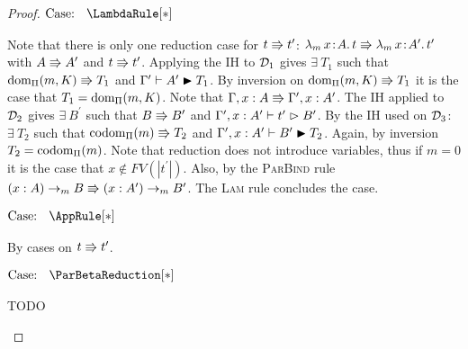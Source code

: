 \begin{proof}
    $\text{Case: }\begin{array}{c} \LambdaRule[*] \end{array}$
    \begin{proofcase}
        Note that there is only one reduction case for $t \Rrightarrow t^\prime$: ${\lambda_m}\, x\! : \! A.\, t \Rrightarrow {\lambda_m}\, x\! : \! A^\prime.\, t^\prime$ with $A \Rrightarrow A^\prime$ and $t \Rrightarrow t^\prime$.
        Applying the IH to $\mathcal{D}_{1}$ gives $\exists\ T_1$ such that $\mbox{\normalfont dom}_\Pi(m, K) \Rrightarrow T_1$ and $\Gamma^\prime \vdash A^\prime \blacktriangleright T_1$.
        By inversion on $\mbox{\normalfont dom}_\Pi(m, K) \Rrightarrow T_1$ it is the case that $T_1 = \mbox{\normalfont dom}_\Pi(m, K)$.
        Note that $\Gamma, x : A \Rrightarrow \Gamma^\prime, x : A^\prime$.
        The IH applied to $\mathcal{D}_{2}$ gives $\exists\ B^\prime$ such that $B \Rrightarrow B^\prime$ and $\Gamma^\prime, x : A^\prime \vdash t^\prime \vartriangleright B^\prime$.
        By the IH used on $\mathcal{D}_{3}$: $\exists\ T_2$ such that $\mbox{\normalfont codom}_\Pi(m) \Rrightarrow T_2$ and $\Gamma^\prime, x : A^\prime \vdash B^\prime \blacktriangleright T_2$.
        Again, by inversion $T_2 = \mbox{\normalfont codom}_\Pi(m)$.
        Note that reduction does not introduce variables, thus if $m = 0$ it is the case that $x \notin FV(|t^\prime|)$.
        Also, by the \textsc{ParBind} rule $(x : A) \to_m B \Rrightarrow (x : A^\prime) \to_m B^\prime$.
        The \textsc{Lam} rule concludes the case.
    \end{proofcase}

    $\text{Case: }\begin{array}{c} \AppRule[*] \end{array}$
    \begin{proofcase}
        By cases on $t \Rrightarrow t^\prime$.

        $\text{Case: }\begin{array}{c} \ParBetaReduction[*] \end{array}$
        \begin{proofcase}
            TODO




\end{proofcase}
\end{proofcase}
\end{proof}
